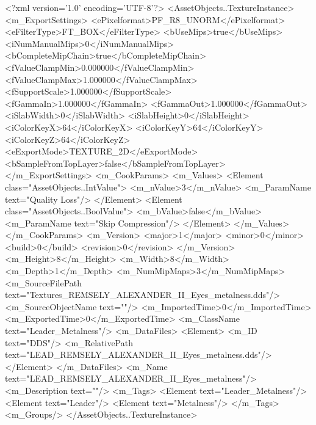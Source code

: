 <?xml version='1.0' encoding='UTF-8'?>
<AssetObjects..TextureInstance>
  <m_ExportSettings>
    <ePixelformat>PF_R8_UNORM</ePixelformat>
    <eFilterType>FT_BOX</eFilterType>
    <bUseMips>true</bUseMips>
    <iNumManualMips>0</iNumManualMips>
    <bCompleteMipChain>true</bCompleteMipChain>
    <fValueClampMin>0.000000</fValueClampMin>
    <fValueClampMax>1.000000</fValueClampMax>
    <fSupportScale>1.000000</fSupportScale>
    <fGammaIn>1.000000</fGammaIn>
    <fGammaOut>1.000000</fGammaOut>
    <iSlabWidth>0</iSlabWidth>
    <iSlabHeight>0</iSlabHeight>
    <iColorKeyX>64</iColorKeyX>
    <iColorKeyY>64</iColorKeyY>
    <iColorKeyZ>64</iColorKeyZ>
    <eExportMode>TEXTURE_2D</eExportMode>
    <bSampleFromTopLayer>false</bSampleFromTopLayer>
  </m_ExportSettings>
  <m_CookParams>
    <m_Values>
      <Element class="AssetObjects..IntValue">
        <m_nValue>3</m_nValue>
        <m_ParamName text="Quality Loss"/>
      </Element>
      <Element class="AssetObjects..BoolValue">
        <m_bValue>false</m_bValue>
        <m_ParamName text="Skip Compression"/>
      </Element>
    </m_Values>
  </m_CookParams>
  <m_Version>
    <major>1</major>
    <minor>0</minor>
    <build>0</build>
    <revision>0</revision>
  </m_Version>
  <m_Height>8</m_Height>
  <m_Width>8</m_Width>
  <m_Depth>1</m_Depth>
  <m_NumMipMaps>3</m_NumMipMaps>
  <m_SourceFilePath text="Textures\LEAD_REMSELY_ALEXANDER_II_Eyes_metalness.dds"/>
  <m_SourceObjectName text=""/>
  <m_ImportedTime>0</m_ImportedTime>
  <m_ExportedTime>0</m_ExportedTime>
  <m_ClassName text="Leader_Metalness"/>
  <m_DataFiles>
    <Element>
      <m_ID text="DDS"/>
      <m_RelativePath text="LEAD_REMSELY_ALEXANDER_II_Eyes_metalness.dds"/>
    </Element>
  </m_DataFiles>
  <m_Name text="LEAD_REMSELY_ALEXANDER_II_Eyes_metalness"/>
  <m_Description text=""/>
  <m_Tags>
    <Element text="Leader_Metalness"/>
    <Element text="Leader"/>
    <Element text="Metalness"/>
  </m_Tags>
  <m_Groups/>
</AssetObjects..TextureInstance>
